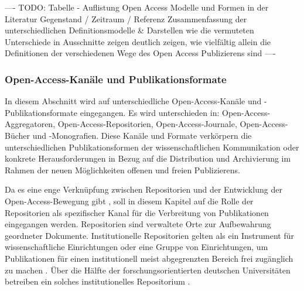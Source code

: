 ---- TODO: Tabelle - Auflistung Open Access  Modelle und Formen in der Literatur
Gegenstand / Zeitraum / Referenz Zusammenfassung der unterschiedlichen Definitionsmodelle & Darstellen wie die vermuteten Unterschiede in Ausschnitte zeigen deutlich zeigen, wie vielfältig allein die Definitionen der verschiedenen Wege des Open Access Publizierens sind ----

\subsubsection{Open-Access-Kanäle und Publikationsformate}

In diesem Abschnitt wird auf unterschiedliche Open-Access-Kanäle und -Publikationsformate eingegangen. Es wird unterschieden in: Open-Access-Aggregatoren, Open-Access-Repositorien, Open-Access-Journale, Open-Access-Bücher und -Monografien. Diese Kanäle und Formate verkörpern die unterschiedlichen Publikationsformen der wissenschaftlichen Kommunikation oder konkrete Herausforderungen in Bezug auf die Distribution und Archivierung im Rahmen der neuen Möglichkeiten offenen und freien Publizierens.

Da es eine enge Verknüpfung zwischen Repositorien und der Entwicklung der Open-Access-Bewegung gibt \cite{Adema_2013} \cite{Offhaus_2012}, soll in diesem Kapitel auf die Rolle der Repositorien als spezifischer Kanal für die Verbreitung von Publikationen eingegangen werden. Repositorien sind verwaltete Orte zur Aufbewahrung geordneter Dokumente. Institutionelle Repositorien gelten als ein Instrument für wissenschaftliche Einrichtungen oder eine Gruppe von Einrichtungen, um Publikationen für einen institutionell meist abgegrenzten Bereich frei zugänglich zu machen \cite{Dobratz_2007} \cite{Baggs_2006}. Über die Hälfte der forschungsorientierten deutschen Universitäten betreiben ein solches institutionelles Repositorium \cite{Schmidt_2009}.

